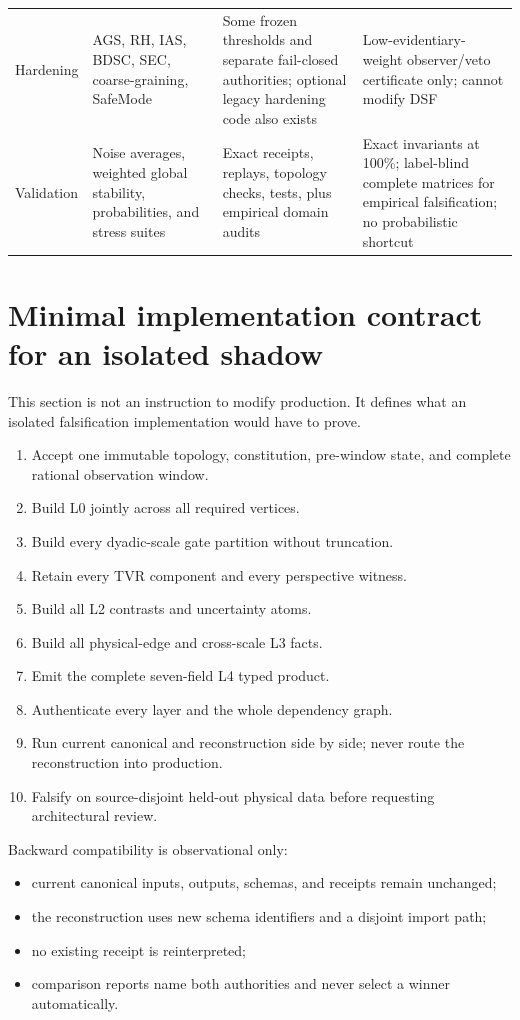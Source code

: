 \documentclass[11pt,oneside]{article}
\begin{document}
\begin{longtable}{
>{\raggedright\arraybackslash}p{}
>{\raggedright\arraybackslash}p{}
>{\raggedright\arraybackslash}p{}
>{\raggedright\arraybackslash}p{}}
\addlinespace
Hardening &
AGS, RH, IAS, BDSC, SEC, coarse-graining, SafeMode &
Some frozen thresholds and separate fail-closed authorities; optional legacy
hardening code also exists &
Low-evidentiary-weight observer/veto certificate only; cannot modify DSF\\
\addlinespace
Validation &
Noise averages, weighted global stability, probabilities, and stress suites &
Exact receipts, replays, topology checks, tests, plus empirical domain audits &
Exact invariants at 100\%; label-blind complete matrices for empirical
falsification; no probabilistic shortcut\\
\bottomrule
\end{longtable}
\normalsize

\section{Minimal implementation contract for an isolated shadow}

This section is not an instruction to modify production. It defines what an
isolated falsification implementation would have to prove.

\begin{enumerate}
  \item Accept one immutable topology, constitution, pre-window state, and
  complete rational observation window.
  \item Build L0 jointly across all required vertices.
  \item Build every dyadic-scale gate partition without truncation.
  \item Retain every TVR component and every perspective witness.
  \item Build all L2 contrasts and uncertainty atoms.
  \item Build all physical-edge and cross-scale L3 facts.
  \item Emit the complete seven-field L4 typed product.
  \item Authenticate every layer and the whole dependency graph.
  \item Run current canonical and reconstruction side by side; never route the
  reconstruction into production.
  \item Falsify on source-disjoint held-out physical data before requesting
  architectural review.
\end{enumerate}

Backward compatibility is observational only:
\begin{itemize}
  \item current canonical inputs, outputs, schemas, and receipts remain
  unchanged;
  \item the reconstruction uses new schema identifiers and a disjoint import
  path;
  \item no existing receipt is reinterpreted;
  \item comparison reports name both authorities and never select a winner
  automatically.
\end{itemize}
\end{document}
